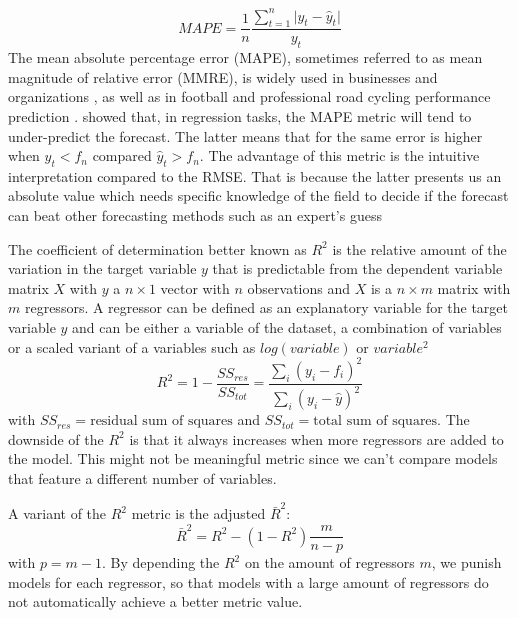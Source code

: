 \documentclass[12pt,a4paper]{article}
\begin{document}
\begin{equation}
MAPE = \dfrac{1}{n}\dfrac{\sum^n_{t=1} \big|y_t-\hat{y}_t\big|}{y_t}
\end{equation}
The mean absolute percentage error (MAPE), sometimes referred to as mean magnitude of relative error (MMRE), is widely used in businesses and organizations \textcite{Tofallis2015}, as well as in football \textcite{Strnad2015} and professional road cycling performance prediction \textcite{Karetnikov2019}. \textcite{Tofallis2015} showed that, in regression tasks, the MAPE metric will tend to under-predict the forecast. The latter means that for the same error is higher when \(\hat{y}_t<f_n\) compared \(\hat{y}_t>f_n\). The advantage of this metric is the intuitive interpretation compared to the RMSE. That is because the latter presents us an absolute value which needs specific knowledge of the field to decide if the forecast can beat other forecasting methods such as an expert's guess

The coefficient of determination better known as \(R^2\) is the relative amount of the variation in the target variable \(y\) that is predictable from the dependent variable matrix \(X\) with \(y\) a \(n \times 1\) vector with \(n\) observations and \(X\) is a \(n\times m\) matrix with \(m\) regressors. A regressor can be defined as an explanatory variable for the target variable \(y\) and can be either a variable of the dataset, a combination of variables or a scaled variant of a variables such as \(log(variable)\) or \(variable^2\)
\begin{equation}
R^2 = 1 - \dfrac{SS_{res}}{SS_{tot}} = \dfrac{\sum_i(y_i - f_i)^2}{\sum_i(y_i- \hat{y})^2}
\end{equation} with \(SS_{res} = \textrm{residual sum of squares}\) and \(SS_{tot} = \textrm{total sum of squares}\). The downside of the \(R^2\) is that it always increases when more regressors are added to the model. This might not be meaningful metric since we can't compare models that feature a different number of variables.

A variant of the \(R^2\) metric is the adjusted \(\bar{R}^2\):
\begin{equation}
\bar{R}^{2}=R^{2}-\left(1-R^{2}\right) \frac{m}{n-p}
\end{equation}
with \(p = m-1\). By depending the \(R^2\) on the amount of regressors \(m\), we punish models for each regressor, so that models with a large amount of regressors do not automatically achieve a better metric value.
\end{document}
